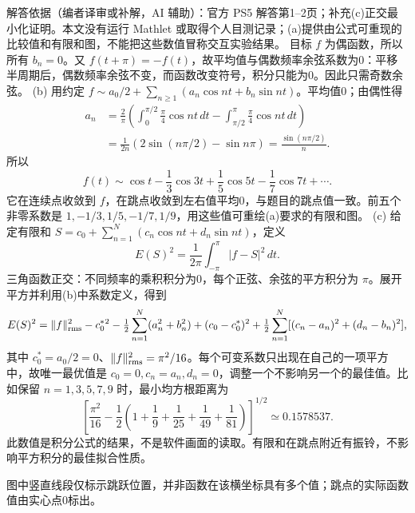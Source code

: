 \begin{solution}
解答依据（编者译审或补解，AI 辅助）：官方 PS5 解答第1--2页；补充(c)正交最小化证明。本文没有运行 Mathlet 或取得个人目测记录；(a)提供由公式可重现的比较值和有限和图，不能把这些数值冒称交互实验结果。
目标 $f$ 为偶函数，所以所有 $b_n=0$。又 $f(t+\pi)=-f(t)$，故平均值与偶数频率余弦系数为0：平移半周期后，偶数频率余弦不变，而函数改变符号，积分只能为0。因此只需奇数余弦。
(b) 用约定 $f\sim a_0/2+\sum_{n\geq1}(a_n\cos nt+b_n\sin nt)$。平均值0；由偶性得
\begin{align*}
 a_n&=\frac2\pi\left(\int_0^{\pi/2}\frac\pi4\cos nt\,dt
 -\int_{\pi/2}^{\pi}\frac\pi4\cos nt\,dt\right)\\
 &=\frac1{2n}\left(2\sin(n\pi/2)-\sin n\pi\right)
 =\frac{\sin(n\pi/2)}n.
\end{align*}
所以
\[
 f(t)\sim\cos t-\frac13\cos3t+\frac15\cos5t-\frac17\cos7t+\cdots.
\]
它在连续点收敛到 $f$，在跳点收敛到左右值平均0，与题目的跳点值一致。前五个非零系数是 $1,-1/3,1/5,-1/7,1/9$，用这些值可重绘(a)要求的有限和图。
(c) 给定有限和 $S=c_0+\sum_{n=1}^N(c_n\cos nt+d_n\sin nt)$，定义
\[
 E(S)^2=\frac1{2\pi}\int_{-\pi}^{\pi}|f-S|^2\,dt.
\]
三角函数正交：不同频率的乘积积分为0，每个正弦、余弦的平方积分为 $\pi$。展开平方并利用(b)中系数定义，得到
\[
 E(S)^2=\|f\|_{\rm rms}^2-c_0^*{}^2
 -\tfrac12\sum_{n=1}^N(a_n^2+b_n^2)
 +(c_0-c_0^*)^2+\tfrac12\sum_{n=1}^N[(c_n-a_n)^2+(d_n-b_n)^2],
\]
其中 $c_0^*=a_0/2=0$、$\|f\|_{\rm rms}^2=\pi^2/16$。每个可变系数只出现在自己的一项平方中，故唯一最优值是 $c_0=0,c_n=a_n,d_n=0$，调整一个不影响另一个的最佳值。比如保留 $n=1,3,5,7,9$ 时，最小均方根距离为
\[
 \left[\frac{\pi^2}{16}-\frac12\left(1+\frac19+\frac1{25}+\frac1{49}+\frac1{81}\right)\right]^{1/2}
 \simeq0.1578537.
\]
此数值是积分公式的结果，不是软件画面的读取。有限和在跳点附近有振铃，不影响平方积分的最佳拟合性质。
\begin{center}\end{center}
图中竖直线段仅标示跳跃位置，并非函数在该横坐标具有多个值；跳点的实际函数值由实心点0标出。
\end{solution}
